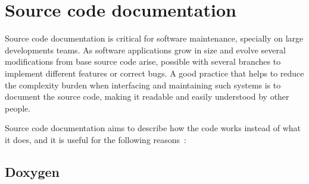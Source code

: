 %
\section{Source code documentation}
\label{sec:source-code-docum}
Source code documentation is critical for software maintenance, specially on
large developments teams. As software applications grow in size and evolve
several modifications from base source code arise, possible with several
branches to implement different features or correct bugs. A good practice that
helps to reduce the complexity burden when interfacing and maintaining such
systems is to document the source code, making it readable and easily understood
by other people.

Source code documentation aims to describe how the code works instead of what it
does, and it is useful for the following reasons~\cite{sourceCodeDocBestPractices}: 


\subsection{Doxygen}
\label{sec:doxygen}



